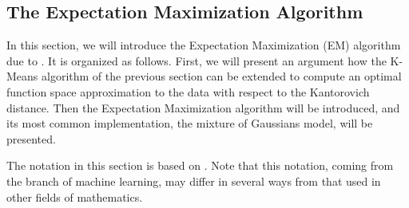 \subsection{The Expectation Maximization Algorithm}
\label{sec:k-means-as-EM}
In this section, we will introduce the Expectation Maximization (EM) algorithm due to \cite{Dempster1977}.
It is organized as follows.
First, we will present an argument how the K-Means algorithm of the previous section can be extended to compute an optimal function space approximation to the data with respect to the Kantorovich distance.
Then the Expectation Maximization algorithm will be introduced, and its most common implementation, the mixture of Gaussians model, will be presented.

The notation in this section is based on .
Note that this notation, coming from the branch of machine learning, may differ in several ways from that used in other fields of mathematics.
